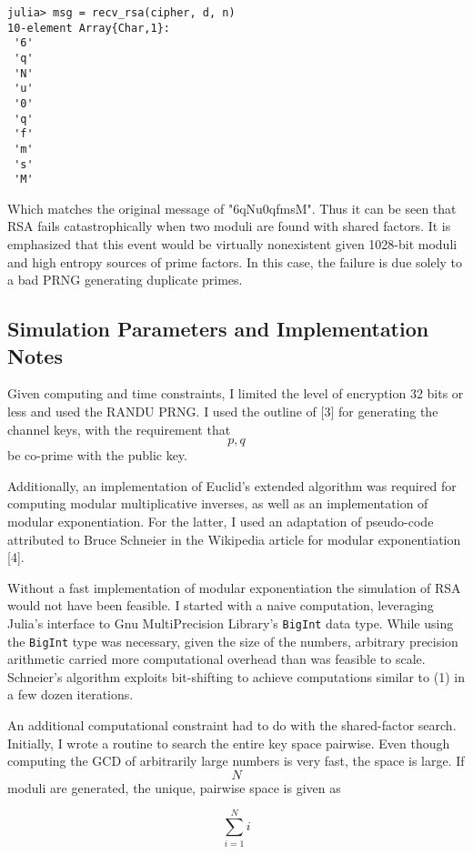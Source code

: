 \documentclass[conference]{/Users/paul/MSEE/ee595/project/report/IEEEtran/IEEEtran}
\begin{document}
\begin{verbatim}
julia> msg = recv_rsa(cipher, d, n)
10-element Array{Char,1}:
 '6'
 'q'
 'N'
 'u'
 '0'
 'q'
 'f'
 'm'
 's'
 'M'
 \end{verbatim}
  
Which matches the original message of "6qNu0qfmsM". Thus it can be seen that RSA fails catastrophically when two moduli are found with shared factors. It is emphasized that this event would be virtually nonexistent given 1028-bit moduli and high entropy sources of prime factors. In this case, the failure is due solely to a bad PRNG generating duplicate primes. 
 
\subsection{Simulation Parameters and Implementation Notes}
Given computing and time constraints, I limited the level of encryption 32 bits or less and used the RANDU PRNG. I used the outline of [3] for generating the channel keys, with the requirement that $$p, q$$ be co-prime with the public key. 

    Additionally, an implementation of Euclid's extended algorithm was required for computing modular multiplicative inverses, as well as an implementation of modular exponentiation. For the latter, I used an adaptation of
pseudo-code attributed to Bruce Schneier in the Wikipedia article for modular exponentiation [4]. 

    Without a fast implementation of modular exponentiation the simulation of RSA would not have been feasible. I started with a naive computation, leveraging Julia's interface to Gnu MultiPrecision Library's \texttt{BigInt} data type. While using the \texttt{BigInt} type was necessary, given the size of the numbers, arbitrary precision arithmetic carried more computational overhead than was feasible to scale. Schneier's algorithm exploits bit-shifting to achieve computations similar
to (1) in a few dozen iterations. 

    An additional computational constraint had to do with the shared-factor search. Initially, I wrote a routine to search the entire key space pairwise. Even though computing the GCD of arbitrarily large numbers is very fast, the space is large. If $$N$$ moduli are generated, the unique, pairwise space is given as
     
\begin{equation} 
    \sum_{i=1}^{N}i
\end{equation} 
 
\end{document}
